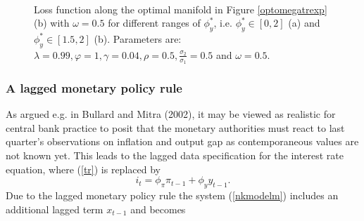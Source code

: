     \begin{figure}
    \begin{center}
        \mbox{\quad
        }
   \end{center}
   \caption{\label{lossfopt_trexp} Loss function along the optimal manifold in Figure \ref{optomegatrexp}(b) with $\omega=0.5$ for different ranges of $\phi_y^*$, i.e. $\phi_y^*\in [0, 2]$ (a) and  $\phi_y^*\in[1.5, 2]$ (b). Parameters are: $\lambda=0.99, \varphi=1, \gamma=0.04, \rho=0.5,
\frac{\sigma_2}{\sigma_1}=0.5$ and $\omega=0.5$.}
    \end{figure}
    
    \pagebreak

\subsubsection{A lagged monetary policy rule}
As argued e.g. in Bullard and Mitra (2002), it may be viewed as realistic for central bank practice to posit that the monetary authorities must react to last quarter's observations on
inflation and output gap as contemporaneous values are not known yet. This leads to the lagged data specification for the interest rate equation, where (\ref{tr}) is
replaced by
\begin{equation}\label{trlag}
     i_t=\phi_\pi\pi_{t-1}+\phi_y y_{t-1}.
\end{equation}
Due to the lagged monetary policy rule the system (\ref{nkmodelm}) includes an additional lagged term $x_{t-1}$ and becomes

